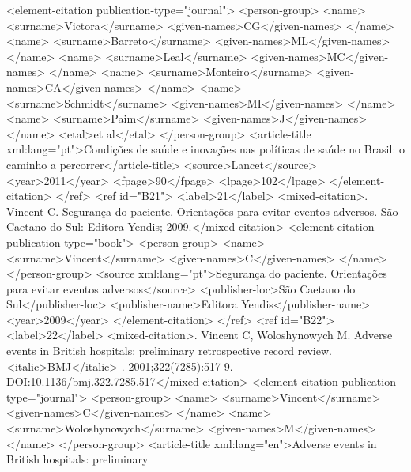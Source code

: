        <element-citation publication-type="journal">
          <person-group>
            <name>
              <surname>Victora</surname>
              <given-names>CG</given-names>
            </name>
            <name>
              <surname>Barreto</surname>
              <given-names>ML</given-names>
            </name>
            <name>
              <surname>Leal</surname>
              <given-names>MC</given-names>
            </name>
            <name>
              <surname>Monteiro</surname>
              <given-names>CA</given-names>
            </name>
            <name>
              <surname>Schmidt</surname>
              <given-names>MI</given-names>
            </name>
            <name>
              <surname>Paim</surname>
              <given-names>J</given-names>
            </name>
            <etal>et al</etal>
          </person-group>
          <article-title xml:lang="pt">Condições de saúde e inovações nas políticas de saúde no
            Brasil: o caminho a percorrer</article-title>
          <source>Lancet</source>
          <year>2011</year>
          <fpage>90</fpage>
          <lpage>102</lpage>
        </element-citation>
      </ref>
      <ref id="B21">
        <label>21</label>
        <mixed-citation>. Vincent C. Segurança do paciente. Orientações para evitar eventos
          adversos. São Caetano do Sul: Editora Yendis; 2009.</mixed-citation>
        <element-citation publication-type="book">
          <person-group>
            <name>
              <surname>Vincent</surname>
              <given-names>C</given-names>
            </name>
          </person-group>
          <source xml:lang="pt">Segurança do paciente. Orientações para evitar eventos
            adversos</source>
          <publisher-loc>São Caetano do Sul</publisher-loc>
          <publisher-name>Editora Yendis</publisher-name>
          <year>2009</year>
        </element-citation>
      </ref>
      <ref id="B22">
        <label>22</label>
        <mixed-citation>. Vincent C, Woloshynowych M. Adverse events in British hospitals:
          preliminary retrospective record review. <italic>BMJ</italic> . 2001;322(7285):517-9.
          DOI:10.1136/bmj.322.7285.517</mixed-citation>
        <element-citation publication-type="journal">
          <person-group>
            <name>
              <surname>Vincent</surname>
              <given-names>C</given-names>
            </name>
            <name>
              <surname>Woloshynowych</surname>
              <given-names>M</given-names>
            </name>
          </person-group>
          <article-title xml:lang="en">Adverse events in British hospitals: preliminary
